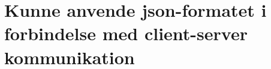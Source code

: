 \section{Kunne anvende json-formatet i forbindelse med client-server kommunikation}\label{sec:spm11}

